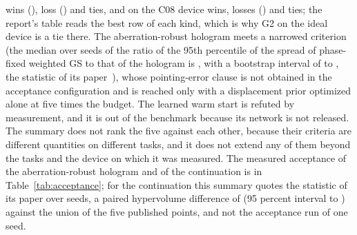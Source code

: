  wins (),  loss () and  ties, and on the C08 device  wins,  losses () and  ties; the report's table reads the best row of each kind, which is why G2 on the ideal device is a tie there. The aberration-robust hologram meets a narrowed criterion (the median over  seeds of the ratio of the 95th percentile of the spread of phase-fixed weighted GS to that of the hologram is , with a bootstrap interval of  to , the statistic of its paper~\cite{aberpaper}), whose pointing-error clause is not obtained in the acceptance configuration and is reached only with a displacement prior optimized alone at five times the budget. The learned warm start is refuted by measurement, and it is out of the benchmark because its network is not released. The summary does not rank the five against each other, because their criteria are different quantities on different tasks, and it does not extend any of them beyond the tasks and the device on which it was measured. The measured acceptance of the aberration-robust hologram and of the continuation is in Table~\ref{tab:acceptance}; for the continuation this summary quotes the statistic of its paper over  seeds, a paired hypervolume difference of  (95 percent interval  to ) against the union of the five published points, and not the acceptance run of one seed.

